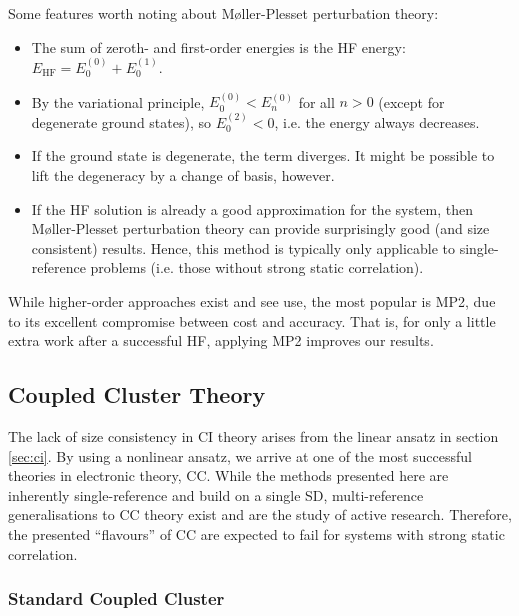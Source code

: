 Some features worth noting about M{\o}ller-Plesset perturbation theory:
\begin{itemize}
    \item The sum of zeroth- and first-order energies is the HF energy: $E_\mathrm{HF} = E_0^{(0)} + E_0^{(1)}$.
    \item By the variational principle, $E_0^{(0)}<E_n^{(0)}$ for all $n>0$ (except for degenerate ground states), so $E_0^{(2)}<0$, i.e. the energy always decreases.
    \item If the ground state is degenerate, the term diverges. It might be possible to lift the degeneracy by a change of basis, however.
    \item If the \gls{HF} solution is already a good approximation for the system, then M{\o}ller-Plesset perturbation theory can provide surprisingly good (and size consistent) results. Hence, this method is typically only applicable to single-reference problems (i.e. those without strong static correlation).
\end{itemize}

While higher-order approaches exist and see use, the most popular is \gls{MP2}, due to its excellent compromise between cost and accuracy. That is, for only a little extra work after a successful \gls{HF}, applying \gls{MP2} improves our results.

\subsection{Coupled Cluster Theory}

The lack of size consistency in \gls{CI} theory arises from the linear ansatz in section \ref{sec:ci}. By using a nonlinear ansatz, we arrive at one of the most successful theories in electronic theory, \gls{CC}.\cite{cizekCorrelation1966,cizekCorrelation1971,paldusTimeIndependent1975,shavittManyBody2009} While the methods presented here are inherently single-reference and build on a single \gls{SD}, multi-reference generalisations to \gls{CC} theory exist and are the study of active research.\cite{aotoInternally2016,evangelistaPerspective2018,hanauerPilot2011,jankowskiApplicability1992,jeziorskiCoupledcluster1981,kohnImproved2020} Therefore, the presented ``flavours'' of \gls{CC} are expected to fail for systems with strong static correlation.

\subsubsection{Standard Coupled Cluster}

